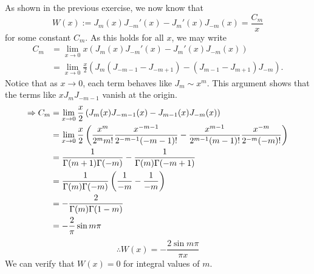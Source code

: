 \item

As shown in the previous exercise, we now know that
\[
    W(x) := J_m(x) J_{-m}'(x) - J_m'(x) J_{-m}(x) = \frac{C_m}{x}
\]
for some constant $C_m$.
As this holds for all $x$, we may write
\begin{align*}
    C_m
    &= \lim_{x \rightarrow 0} x \left(
        J_m(x) J_{-m}'(x) - J_m'(x) J_{-m}(x)
    \right) \\
    &= \lim_{x \rightarrow 0} \frac{x}{2} \left(
        J_m \left( J_{-m - 1} - J_{-m + 1} \right)
        - \left( J_{m - 1} - J_{m + 1} \right) J_{-m}
    \right).
\end{align*}
Notice that as $x \rightarrow 0$, each term behaves like $J_m \sim x^m$.
This argument shows that the terms like $x J_{m} J_{-m-1}$ vanish at the origin.
\begin{align*}
    \Rightarrow C_m
    &= \lim_{x \rightarrow 0} \frac{x}{2} \left(
        J_m (x) J_{-m - 1}(x) - J_{m - 1}(x) J_{-m} (x)
    \right) \\
    &= \lim_{x \rightarrow 0} \frac{x}{2} \left(
        \frac{x^m}{2^m m!} \frac{x^{-m-1}}{2^{-m-1} (-m-1)!}
        - \frac{x^{m-1}}{2^{m-1} (m-1)!} \frac{x^{-m}}{2^{-m} (-m)!}
    \right) \\
    &= \frac{1}{\Gamma(m + 1)\Gamma(-m)} - \frac{1}{\Gamma(m)\Gamma(-m+1)} \\
    &= \frac{1}{\Gamma(m)\Gamma(-m)} \left( \frac{1}{-m} - \frac{1}{-m} \right) \\
    &= -\frac{2}{\Gamma(m)\Gamma(1-m)} \\
    &= -\frac{2}{\pi} \sin m\pi
\end{align*}
\[
    \therefore W(x) = -\frac{2\sin m\pi}{\pi x}
\]
We can verify that $W(x) = 0$ for integral values of $m$.
